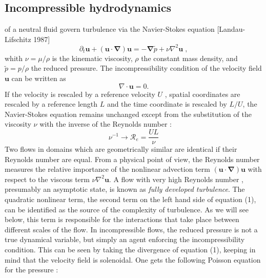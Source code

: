 \subsection{Incompressible hydrodynamics}
 of a neutral fluid govern turbulence via the Navier-Stokes equation [Landau-Lifschitz 1987]
\begin{equation}
    \partial_t\mathbf{u}+(\mathbf{u}\cdot\boldsymbol{\nabla})\mathbf{u}=-\boldsymbol{\nabla}\tilde{p}+\nu\nabla^2\mathbf{u}\;,
\end{equation}
whith $\nu=\mu/\rho$ is the kinematic viscosity, $\rho$ the constant mass density, and $\tilde{p}=p/\rho$ the reduced pressure. The incompressibility condition of the velocity field $\mathbf{u}$ can be written as
\begin{equation}
    \nabla\cdot\mathbf{u}=0.
\end{equation}
If the velocity is rescaled by a reference velocity $U$ , spatial coordinates are rescaled by a reference length $L$ and the time coordinate is rescaled by $L/U$, the Navier-Stokes equation remains unchanged except from the substitution of the viscosity $\nu$ with the inverse of the Reynolds number :
\begin{equation}
    \nu^{-1}\longrightarrow \mathcal{R}_e=\frac{UL}{\nu}
\end{equation}
Two flows in domains which are geometrically similar are identical if their Reynolds number are equal. From a physical point of view, the Reynolds number measures the relative importance of the nonlinear advection term $(\mathbf{u}\cdot\boldsymbol{\nabla})\mathbf{u}$ with respect to the viscous term $\nu\nabla^2\mathbf{u}$. A flow with very high Reynolds number , presumably an asymptotic state, is known as \emph{fully developed turbulence}. The quadratic nonlinear term, the second term on the left hand side of equation (1), can be identified as the source of the complexity of turbulence. As we will see below, this term is responsible for the interactions
that take place between different scales of the flow.
In incompressible flows, the reduced pressure is not a true dynamical variable, but simply an agent enforcing the incompressibility condition. This can be seen by taking the divergence of equation (1), keeping in mind that the velocity field is solenoidal. One gets the following Poisson equation for the pressure :
